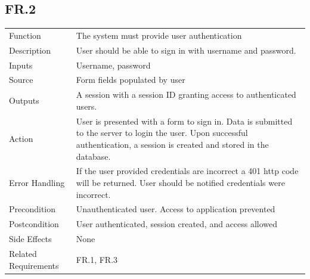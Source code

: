 \documentclass[12pt]{article}
\begin{document}
    \subsection*{FR.2}
    \begin{center}
        \begin{tabular}{| p{10em} p{26em} |}
        \hline
         Function & The system must provide user authentication\\
         Description & User should be able to sign in with username and password.\\
         Inputs & Username, password\\
         Source & Form fields populated by user\\
         Outputs & A session with a session ID granting access to authenticated users.\\
         Action & User is presented with a form to sign in. Data is submitted to the server to login the user. Upon successful authentication, a session is created and stored in the database. \\
         Error Handling & If the user provided credentials are incorrect a 401 http code will be returned. User should be notified credentials were incorrect.\\
         Precondition & Unauthenticated user. Access to application prevented\\
         Postcondition & User authenticated, session created, and access allowed\\
         Side Effects & None \\
         Related Requirements & FR.1, FR.3\\
         \hline
        \end{tabular}
    \end{center}
\end{document}
